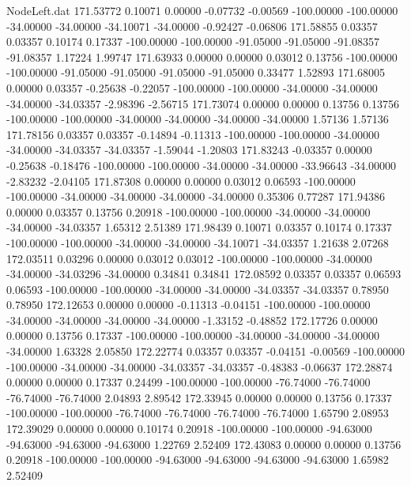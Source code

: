 \begin{filecontents}{NodeLeft.dat}
 171.53772    0.10071    0.00000    -0.07732   -0.00569 -100.00000 -100.00000  -34.00000  -34.00000  -34.10071  -34.00000   -0.92427   -0.06806
 171.58855    0.03357    0.03357     0.10174    0.17337 -100.00000 -100.00000  -91.05000  -91.05000  -91.08357  -91.08357    1.17224    1.99747
 171.63933    0.00000    0.00000     0.03012    0.13756 -100.00000 -100.00000  -91.05000  -91.05000  -91.05000  -91.05000    0.33477    1.52893
 171.68005    0.00000    0.03357    -0.25638   -0.22057 -100.00000 -100.00000  -34.00000  -34.00000  -34.00000  -34.03357   -2.98396   -2.56715
 171.73074    0.00000    0.00000     0.13756    0.13756 -100.00000 -100.00000  -34.00000  -34.00000  -34.00000  -34.00000    1.57136    1.57136
 171.78156    0.03357    0.03357    -0.14894   -0.11313 -100.00000 -100.00000  -34.00000  -34.00000  -34.03357  -34.03357   -1.59044   -1.20803
 171.83243   -0.03357    0.00000    -0.25638   -0.18476 -100.00000 -100.00000  -34.00000  -34.00000  -33.96643  -34.00000   -2.83232   -2.04105
 171.87308    0.00000    0.00000     0.03012    0.06593 -100.00000 -100.00000  -34.00000  -34.00000  -34.00000  -34.00000    0.35306    0.77287
 171.94386    0.00000    0.03357     0.13756    0.20918 -100.00000 -100.00000  -34.00000  -34.00000  -34.00000  -34.03357    1.65312    2.51389
 171.98439    0.10071    0.03357     0.10174    0.17337 -100.00000 -100.00000  -34.00000  -34.00000  -34.10071  -34.03357    1.21638    2.07268
 172.03511    0.03296    0.00000     0.03012    0.03012 -100.00000 -100.00000  -34.00000  -34.00000  -34.03296  -34.00000    0.34841    0.34841
 172.08592    0.03357    0.03357     0.06593    0.06593 -100.00000 -100.00000  -34.00000  -34.00000  -34.03357  -34.03357    0.78950    0.78950
 172.12653    0.00000    0.00000    -0.11313   -0.04151 -100.00000 -100.00000  -34.00000  -34.00000  -34.00000  -34.00000   -1.33152   -0.48852
 172.17726    0.00000    0.00000     0.13756    0.17337 -100.00000 -100.00000  -34.00000  -34.00000  -34.00000  -34.00000    1.63328    2.05850
 172.22774    0.03357    0.03357    -0.04151   -0.00569 -100.00000 -100.00000  -34.00000  -34.00000  -34.03357  -34.03357   -0.48383   -0.06637
 172.28874    0.00000    0.00000     0.17337    0.24499 -100.00000 -100.00000  -76.74000  -76.74000  -76.74000  -76.74000    2.04893    2.89542
 172.33945    0.00000    0.00000     0.13756    0.17337 -100.00000 -100.00000  -76.74000  -76.74000  -76.74000  -76.74000    1.65790    2.08953
 172.39029    0.00000    0.00000     0.10174    0.20918 -100.00000 -100.00000  -94.63000  -94.63000  -94.63000  -94.63000    1.22769    2.52409
 172.43083    0.00000    0.00000     0.13756    0.20918 -100.00000 -100.00000  -94.63000  -94.63000  -94.63000  -94.63000    1.65982    2.52409

\end{filecontents}
